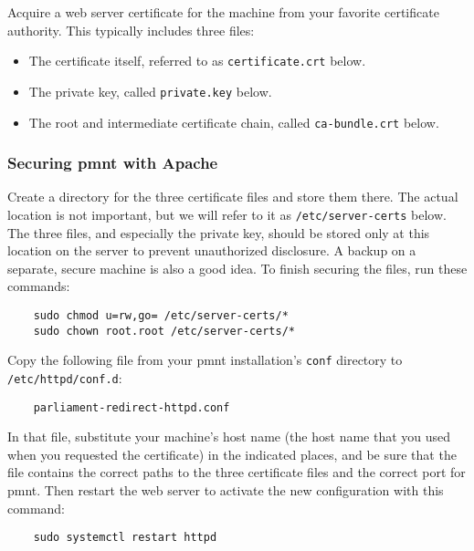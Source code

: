 Acquire a web server certificate for the machine from your favorite certificate authority.  This typically includes three files:

\begin{itemize}
	\item The certificate itself, referred to as \texttt{certificate.crt} below.

	\item The private key, called \texttt{private.key} below.

	\item The root and intermediate certificate chain, called \texttt{ca-bundle.crt} below.
\end{itemize}



\subsubsection{Securing \ac{pmnt} with Apache}
\label{section-securing-parliament-apache}

Create a directory for the three certificate files and store them there.  The actual location is not important, but we will refer to it as \texttt{/etc/server-certs} below.  The three files, and especially the private key, should be stored only at this location on the server to prevent unauthorized disclosure.  A backup on a separate, secure machine is also a good idea.  To finish securing the files, run these commands:

\begin{Verbatim}
	sudo chmod u=rw,go= /etc/server-certs/*
	sudo chown root.root /etc/server-certs/*
\end{Verbatim}

Copy the following file from your \ac{pmnt} installation's \texttt{conf} directory to \texttt{/etc/httpd/conf.d}:

\begin{Verbatim}
	parliament-redirect-httpd.conf
\end{Verbatim}

In that file, substitute your machine's host name (the host name that you used when you requested the certificate) in the indicated places, and be sure that the file contains the correct paths to the three certificate files and the correct port for \ac{pmnt}.  Then restart the web server to activate the new configuration with this command:

\begin{Verbatim}
	sudo systemctl restart httpd
\end{Verbatim}



